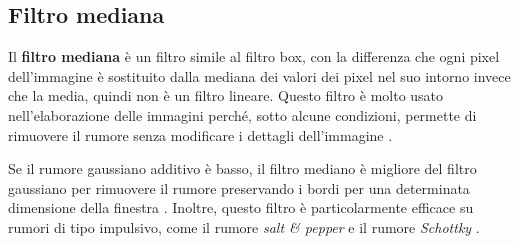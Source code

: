 \documentclass[../main.tex]{subfiles}
\begin{document}
	\subsection{Filtro mediana}
	
	Il \textbf{filtro mediana} è un filtro simile al filtro box, con la differenza che ogni pixel dell'immagine è sostituito dalla mediana dei valori dei pixel nel suo intorno invece che la media, quindi non è un filtro lineare. Questo filtro è molto usato nell'elaborazione delle immagini perché, sotto alcune condizioni, permette di rimuovere il rumore senza modificare i dettagli dell'immagine \cite{rezaee_2021}.
	
	Se il rumore gaussiano additivo è basso, il filtro mediano è migliore del filtro gaussiano per rimuovere il rumore preservando i bordi per una determinata dimensione della finestra \cite{castro_2009}. Inoltre, questo filtro è particolarmente efficace su rumori di tipo impulsivo, come il rumore \textit{salt \& pepper} e il rumore \textit{Schottky} \cite{arce_2004}.\\
	
\end{document}
